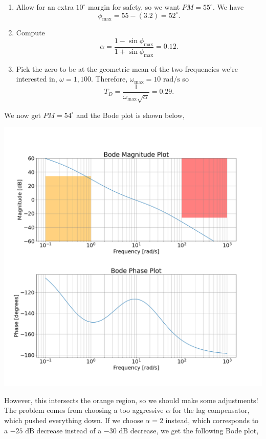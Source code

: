 \documentclass{article}
\begin{document}
\begin{enumerate}[label=\textbf{4.\arabic*}]
\begin{enumerate}[label=(\alph*)]
\begin{enumerate}[label=(\arabic*)]
        \item Allow for an extra $10^\circ$ margin for safety, so we want $PM=55^\circ.$ We have 
        \begin{equation}
            \phi_\text{max} = 55 - (3.2) = 52^\circ.
        \end{equation}
        \item Compute 
        \begin{equation}
            \alpha = \frac{1-\sin\phi_\text{max}}{1+\sin\phi_\text{max}} = 0.12.
        \end{equation}
        \item Pick the zero to be at the geometric mean of the two frequencies we're interested in, $\omega=1,100.$ Therefore, $\omega_\text{max}=10\text{ rad/s}$ so 
        \begin{equation}
            T_D = \frac{1}{\omega_\text{max}\sqrt{\alpha}} = 0.29.
        \end{equation}
    \end{enumerate}
    We now get $PM=54^\circ$ and the Bode plot is shown below,
    \begin{center}
        \includegraphics[width=\linewidth]{A4_imgs/q5_bode_d_2.png}
    \end{center}
    However, this intersects the orange region, so we should make some adjustments! The problem comes from choosing a too aggressive $\alpha$ for the lag compensator, which pushed everything down. If we choose $\alpha = 2$ instead, which corresponds to a $-25\text{ dB}$ decrease instead of a $-30\text{ dB}$ decrease, we get the following Bode plot,

\end{enumerate}
\end{enumerate}
\end{document}
